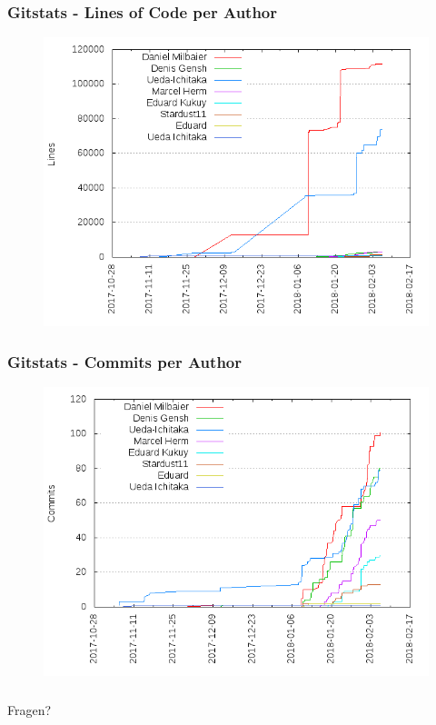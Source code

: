 \documentclass[11pt, usepdftitle=false,...]{beamer}
\begin{document}
			\begin{frame}
				\frametitle{Gitstats - Lines of Code per Author}
				\begin{figure}[ht] 
					\centering
					\includegraphics[scale=0.50, trim= 1cm 0 0 0]{lines_of_code_by_author.png}
					\label{fig4}
				\end{figure}
			\end{frame}
			
			\begin{frame}
				\frametitle{Gitstats - Commits per Author}
				\begin{figure}[ht] 
					\centering
					\includegraphics[scale=0.50, trim= 1cm 0 0 0]{commits_by_author.png}
					\label{fig5}
				\end{figure}
			\end{frame}
			
			\begin{frame}
				\frametitle{}
				\centering
				\Huge Fragen?
			\end{frame}
	
\end{document}
